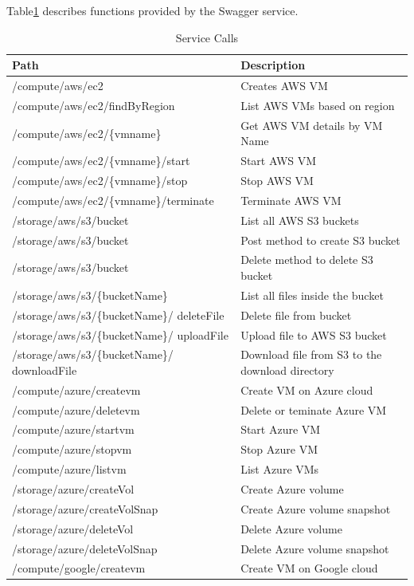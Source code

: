 Table\ref{t:serviceFunctions} describes functions provided by the Swagger service.
\begin{table}[htb]
\centering
\caption{Service Calls}
\label{t:serviceFunctions}
\begin{tabular} {p{5cm}|p{3.5cm}}
Path & Description \\
\hline
/compute/aws/ec2    & Creates AWS VM \\
/compute/aws/ec2/findByRegion & List AWS VMs based on region \\
/compute/aws/ec2/\{vmname\} & Get AWS VM details by VM Name \\
/compute/aws/ec2/\{vmname\}/start & Start AWS VM \\
/compute/aws/ec2/\{vmname\}/stop & Stop AWS VM \\
/compute/aws/ec2/\{vmname\}/terminate & Terminate AWS VM \\
/storage/aws/s3/bucket & List all AWS S3 buckets \\
/storage/aws/s3/bucket & Post method to create S3 bucket \\
/storage/aws/s3/bucket & Delete method to delete S3 bucket \\
/storage/aws/s3/\{bucketName\} & List all files inside the bucket \\
/storage/aws/s3/\{bucketName\}/ deleteFile & Delete file from bucket \\
/storage/aws/s3/\{bucketName\}/ uploadFile & Upload file to AWS S3 bucket \\
/storage/aws/s3/\{bucketName\}/ downloadFile & Download file from S3 to the download directory \\
/compute/azure/createvm & Create VM on Azure cloud \\
/compute/azure/deletevm & Delete or teminate Azure VM \\
/compute/azure/startvm & Start Azure VM \\
/compute/azure/stopvm & Stop Azure VM \\
/compute/azure/listvm & List Azure VMs \\
/storage/azure/createVol & Create Azure volume \\
/storage/azure/createVolSnap & Create Azure volume snapshot \\
/storage/azure/deleteVol & Delete Azure volume \\
/storage/azure/deleteVolSnap & Delete Azure volume snapshot \\
/compute/google/createvm & Create VM on Google cloud \\

\end{tabular}
\end{table}
